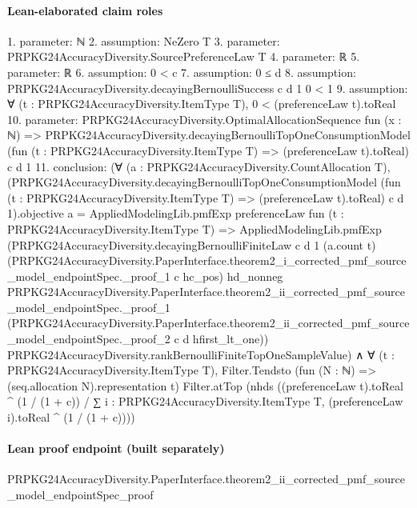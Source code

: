 \documentclass[10pt]{article}
\begin{document}
\paragraph{Lean-elaborated claim roles}\begin{ReviewVerbatim}
1. parameter: ℕ
2. assumption: NeZero T
3. parameter: PRPKG24AccuracyDiversity.SourcePreferenceLaw T
4. parameter: ℝ
5. parameter: ℝ
6. assumption: 0 < c
7. assumption: 0 ≤ d
8. assumption: PRPKG24AccuracyDiversity.decayingBernoulliSuccess c d 1 0 < 1
9. assumption: ∀ (t : PRPKG24AccuracyDiversity.ItemType T), 0 < (preferenceLaw t).toReal
10. parameter: PRPKG24AccuracyDiversity.OptimalAllocationSequence fun (x : ℕ) =>
  PRPKG24AccuracyDiversity.decayingBernoulliTopOneConsumptionModel
    (fun (t : PRPKG24AccuracyDiversity.ItemType T) => (preferenceLaw t).toReal) c d 1
11. conclusion: (∀ (a : PRPKG24AccuracyDiversity.CountAllocation T),
    (PRPKG24AccuracyDiversity.decayingBernoulliTopOneConsumptionModel
            (fun (t : PRPKG24AccuracyDiversity.ItemType T) => (preferenceLaw t).toReal) c d 1).objective
        a =
      AppliedModelingLib.pmfExp preferenceLaw fun (t : PRPKG24AccuracyDiversity.ItemType T) =>
        AppliedModelingLib.pmfExp
          (PRPKG24AccuracyDiversity.decayingBernoulliFiniteLaw c d 1 (a.count t)
            (PRPKG24AccuracyDiversity.PaperInterface.theorem2_i_corrected_pmf_source_model_endpointSpec._proof_1 c
              hc_pos)
            hd_nonneg
            PRPKG24AccuracyDiversity.PaperInterface.theorem2_ii_corrected_pmf_source_model_endpointSpec._proof_1
            (PRPKG24AccuracyDiversity.PaperInterface.theorem2_ii_corrected_pmf_source_model_endpointSpec._proof_2 c d
              hfirst_lt_one))
          PRPKG24AccuracyDiversity.rankBernoulliFiniteTopOneSampleValue) ∧
  ∀ (t : PRPKG24AccuracyDiversity.ItemType T),
    Filter.Tendsto (fun (N : ℕ) => (seq.allocation N).representation t) Filter.atTop
      (nhds
        ((preferenceLaw t).toReal ^ (1 / (1 + c)) /
          ∑ i : PRPKG24AccuracyDiversity.ItemType T, (preferenceLaw i).toReal ^ (1 / (1 + c))))
\end{ReviewVerbatim}

\paragraph{Lean proof endpoint (built separately)}\begin{ReviewVerbatim}
PRPKG24AccuracyDiversity.PaperInterface.theorem2_ii_corrected_pmf_source_model_endpointSpec_proof
\end{ReviewVerbatim}
\end{document}

